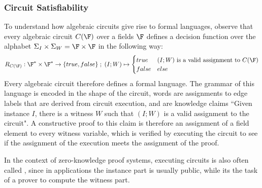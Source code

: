 \subsubsection{Circuit Satisfiability}
\label{circuit-satisfiability} To understand how algebraic circuits give rise to formal languages, observe that every algebraic circuit $C(\F)$ over a fields $\F$ defines a decision function over the alphabet $\Sigma_I \times \Sigma_W = \F \times \F$ in the following way:
\begin{equation}
R_{C(\F)} : \F^* \times \F^* \to \{true, false\}\;;\;
(I;W) \mapsto
\begin{cases}
true & (I;W) \text{ is a valid assignment to } C(\F)\\
false & else
\end{cases}
\end{equation}
Every algebraic circuit therefore defines a formal language. The grammar of this language is encoded in the shape of the circuit, words are assignments to edge labels that are derived from circuit execution, and  are knowledge claims ``Given instance $I$, there is a witness $W$ such that $(I;W)$ is a valid assignment to the circuit". A constructive proof to this claim is therefore an assignment of a field element to every witness variable, which is verified by executing the circuit to see if the assignment of the execution meets the assignment of the proof. 

In the context of zero-knowledge proof systems, executing circuits is also often called , since in applications the instance part is usually public, while its the task of a prover to compute the witness part.

